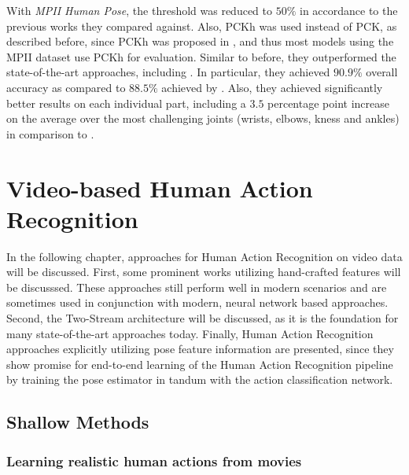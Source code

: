 With \textit{MPII Human Pose}, the threshold was reduced to $50\%$ in accordance to the previous works they compared against.
Also, PCKh was used instead of PCK, as described before, since PCKh was proposed in \cite{andriluka_2d_2014}, and thus most models using the MPII dataset use PCKh for evaluation.
Similar to before, they outperformed the state-of-the-art approaches, including \cite{wei_convolutional_2016}.
In particular, they achieved $90.9\%$ overall accuracy as compared to $88.5\%$ achieved by \cite{wei_convolutional_2016}.
Also, they achieved significantly better results on each individual part, including a $3.5$ percentage point increase on the average over the most challenging joints (wrists, elbows, kness and ankles) in comparison to \cite{wei_convolutional_2016}. 


\section{Video-based Human Action Recognition}

In the following chapter, approaches for Human Action Recognition on video data will be discussed.
First, some prominent works utilizing hand-crafted features will be discusssed.
These approaches still perform well in modern scenarios and are sometimes used in conjunction with modern, neural network based approaches.
Second, the Two-Stream architecture will be discussed, as it is the foundation for many state-of-the-art approaches today.
Finally, Human Action Recognition approaches explicitly utilizing pose feature information are presented, since they show promise for end-to-end learning of the Human Action Recognition pipeline by training the pose estimator in tandum with the action classification network. 

\subsection{Shallow Methods}
\label{sec:har_shallow}
\subsubsection{Learning realistic human actions from movies}
\label{sec:laptev-shallow}

